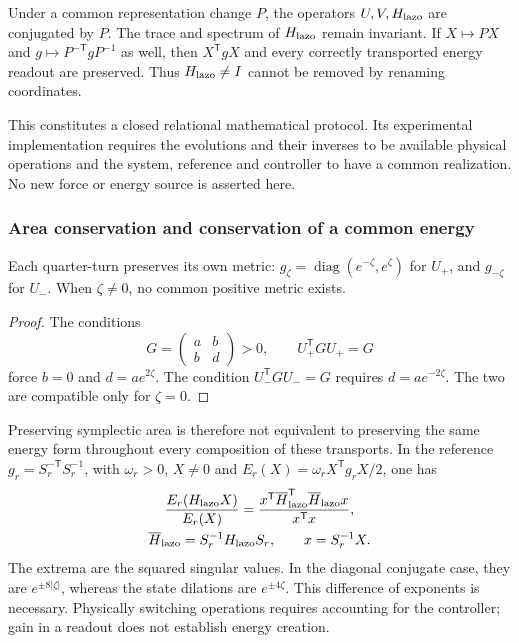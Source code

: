Under a common representation change \(P\), the operators
\(U,V,H_{\rm lazo}\) are conjugated by \(P\).
The trace and spectrum of \(H_{\rm lazo}\) remain invariant.
If \(X\mapsto PX\) and
\(g\mapsto P^{-\mathsf T}gP^{-1}\) as well, then
\(X^{\mathsf T}gX\) and every correctly transported energy readout are
preserved. Thus \(H_{\rm lazo}\ne I\) cannot be removed by renaming
coordinates.

This constitutes a closed relational mathematical protocol.
Its experimental implementation requires the evolutions and their
inverses to be available physical operations and the system, reference
and controller to have a common realization.
No new force or energy source is asserted here.

\subsubsection{Area conservation and conservation of a common energy}
\label{md:comp:area-energia}

\begin{proposition}
\label{md:comp:prop-metrica}
Each quarter-turn preserves its own metric:
\(g_\zeta=\operatorname{diag}(e^{-\zeta},e^\zeta)\) for \(U_+\),
and \(g_{-\zeta}\) for \(U_-\). When \(\zeta\ne0\), no common
positive metric exists.
\end{proposition}
\begin{proof}
The conditions
\[
 G=\begin{pmatrix}a&b\\b&d\end{pmatrix}>0,
 \qquad U_+^{\mathsf T}GU_+=G
\]
force \(b=0\) and \(d=ae^{2\zeta}\).
The condition \(U_-^{\mathsf T}GU_-=G\) requires
\(d=ae^{-2\zeta}\). The two are compatible only for \(\zeta=0\).
\end{proof}

Preserving symplectic area is therefore not equivalent to preserving
the same energy form throughout every composition of these transports.
In the reference \(g_r=S_r^{-\mathsf T}S_r^{-1}\), with \(\omega_r>0\),
\(X\ne0\) and \(E_r(X)=\omega_r X^{\mathsf T}g_rX/2\), one has
\begin{equation}
 \begin{gathered}
 \frac{E_r(H_{\rm lazo}X)}{E_r(X)}
 =\frac{x^{\mathsf T}\overline{H}_{\rm lazo}^{\mathsf T}
                   \overline{H}_{\rm lazo}x}{x^{\mathsf T}x},\\
 \overline{H}_{\rm lazo}=S_r^{-1}H_{\rm lazo}S_r,\qquad
 x=S_r^{-1}X.
 \end{gathered}
 \label{md:comp:cociente-energia}
\end{equation}
The extrema are the squared singular values.
In the diagonal conjugate case, they are \(e^{\pm8|\zeta|}\),
whereas the state dilations are \(e^{\pm4\zeta}\).
This difference of exponents is necessary. Physically switching
operations requires accounting for the controller; gain in a readout
does not establish energy creation.

